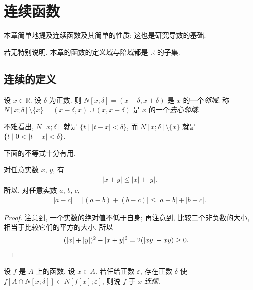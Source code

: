 \chapter{连续函数}

本章简单地提及连续函数及其简单的性质;
这也是研究导数的基础.

若无特别说明,
本章的函数的定义域与陪域都是 $\mathbb{R}$ 的子集.

\section{连续的定义}

\begin{definition}
    设 $x \in \mathbb{R}$.
    设 $\delta$ 为正数.
    则
    $N[x; \delta] = (x - \delta, x + \delta)$
    是 $x$ 的一个\emph{邻域}.
    称
    $N[x; \delta] \setminus \{ x \} = (x - \delta, x) \cup (x, x + \delta)$
    是 $x$ 的一个\emph{去心邻域}.
\end{definition}

不难看出,
$N[x; \delta]$ 就是 $\{ t \mid |t - x| < \delta \}$,
而 $N[x; \delta] \setminus \{ x \}$ 就是
$\{ t \mid 0 < |t - x| < \delta \}$.

下面的不等式十分有用.

\begin{theorem}
    对任意实数 $x$, $y$, 有
    \begin{align*}
        |x + y| \leq |x| + |y|.
    \end{align*}
    所以, 对任意实数 $a$, $b$, $c$,
    \begin{align*}
        |a - c| = |(a - b) + (b - c)| \leq |a - b| + |b - c|.
    \end{align*}
\end{theorem}

\begin{proof}
    注意到, 一个实数的绝对值不低于自身;
    再注意到, 比较二个非负数的大小,
    相当于比较它们的平方的大小.
    所以
    \begin{align*}
         & {(|x| + |y|)^2 - |x + y|^2 = 2(|xy| - xy) \geq 0.} \qedhere
    \end{align*}
\end{proof}

\begin{definition}
    设 $f$ 是 $A$ 上的函数.
    设 $x \in A$.
    若任给正数 $\varepsilon$,
    存在正数 $\delta$ 使
    $f[A \cap N[x; \delta]] \subset N[f[x]; \varepsilon]$,
    则说 $f$ 于 $x$ \emph{连续}.
\end{definition}

